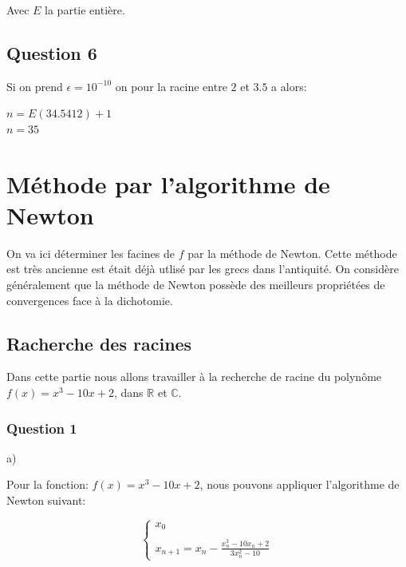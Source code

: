 \documentclass{article}
\begin{document}
	Avec $E$ la partie entière.
	
	\subsection{Question 6}
	
	Si on prend $\epsilon = 10^{-10}$ on pour la  racine entre $2$ et $3.5$ a alors:
	
	\begin{center}
		\begin{large}
			$n=E(34.5412)+1$\\
			$n=35$
		\end{large}
	\end{center}

	\newpage

	\section{Méthode par l'algorithme de Newton}
	
	On va ici déterminer les facines de $f$ par la méthode
	de Newton.
	Cette méthode est très ancienne est était déjà utlisé par les grecs dans l'antiquité.
	On considère généralement que la méthode de Newton possède des meilleurs propriétées de convergences face à la dichotomie.
	
	\subsection{Racherche des racines}
	
	Dans cette partie nous allons travailler à la recherche de racine du polynôme $f(x)=x^{3}-10x+2$, dans
	$\mathbb{R}$ et $\mathbb{C}$.
	
	\subsubsection{Question 1}

	a)	
	
	Pour la fonction: $f(x)=x^{3}-10x+2$, nous pouvons appliquer l'algorithme de Newton suivant:
	
	\begin{large}
		$$
		\left\{
			\begin{array}{ll}
				x_{0} \\ \\
				x_{n+1}=x_{n}-\frac{x_{n}^{3}-10x_{n}+2}{3x_{n}^{2}-10}
			\end{array}
		\right.
		$$
	\end{large}
\end{document}
